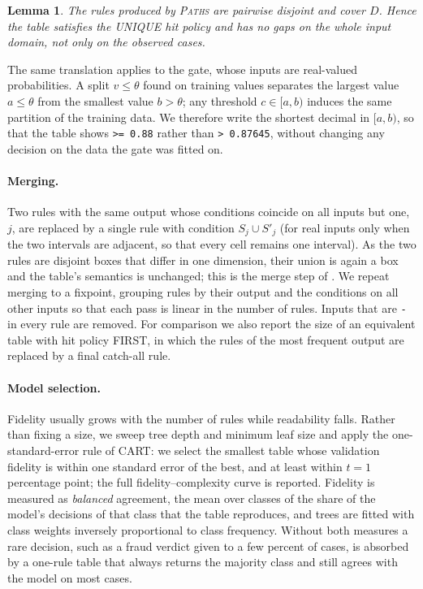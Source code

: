 \documentclass[a4paper,fleqn]{cas-sc}
\newtheorem{lemma}{Lemma}
\theoremstyle{definition}
\newcommand{\feel}[1]{\texttt{#1}}
\begin{document}
\begin{lemma}\label{lem:partition}
The rules produced by \textsc{Paths} are pairwise disjoint and cover $D$. Hence the table satisfies the UNIQUE hit policy and has no gaps on the whole input domain, not only on the observed cases.
\end{lemma}

The same translation applies to the gate, whose inputs are real-valued probabilities. A split $v\le\theta$ found on training values separates the largest value $a\le\theta$ from the smallest value $b>\theta$; any threshold $c\in[a,b)$ induces the same partition of the training data. We therefore write the shortest decimal in $[a,b)$, so that the table shows \feel{>= 0.88} rather than \feel{> 0.87645}, without changing any decision on the data the gate was fitted on.

\paragraph{Merging.} Two rules with the same output whose conditions coincide on all inputs but one, $j$, are replaced by a single rule with condition $S_j\cup S'_j$ (for real inputs only when the two intervals are adjacent, so that every cell remains one interval). As the two rules are disjoint boxes that differ in one dimension, their union is again a box and the table's semantics is unchanged; this is the merge step of \citet{calvanese2018}. We repeat merging to a fixpoint, grouping rules by their output and the conditions on all other inputs so that each pass is linear in the number of rules. Inputs that are \feel{-} in every rule are removed. For comparison we also report the size of an equivalent table with hit policy FIRST, in which the rules of the most frequent output are replaced by a final catch-all rule.

\paragraph{Model selection.} Fidelity usually grows with the number of rules while readability falls. Rather than fixing a size, we sweep tree depth and minimum leaf size and apply the one-standard-error rule of CART: we select the smallest table whose validation fidelity is within one standard error of the best, and at least within $t=1$ percentage point; the full fidelity--complexity curve is reported. Fidelity is measured as \emph{balanced} agreement, the mean over classes of the share of the model's decisions of that class that the table reproduces, and trees are fitted with class weights inversely proportional to class frequency. Without both measures a rare decision, such as a fraud verdict given to a few percent of cases, is absorbed by a one-rule table that always returns the majority class and still agrees with the model on most cases.
\end{document}

